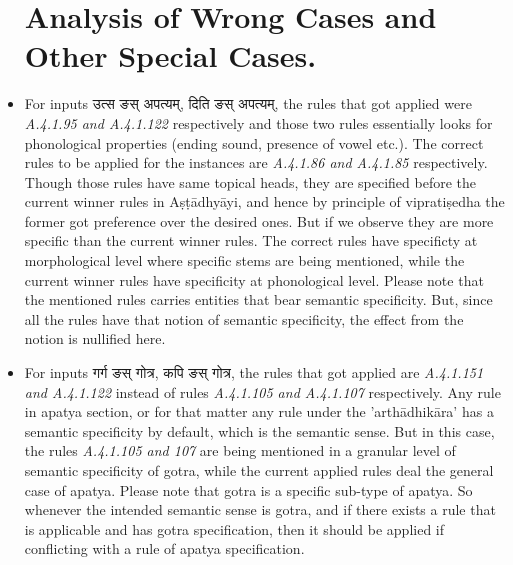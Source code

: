 \documentclass[a4paper,11pt,twoside,openright]{report}
\begin{document}
\begin{itemize}

\section{Analysis of Wrong Cases and Other Special Cases.}
\label{wrongCases}

\item For inputs {\skt उत्स ङस् अपत्यम्, दिति ङस् अपत्यम्}, the rules that got applied were \textsl{ A.4.1.95 and \sl A.4.1.122} respectively and those two rules essentially looks for phonological properties (ending sound, 	presence of vowel etc.). The correct rules to be applied for the instances are \textsl{ A.4.1.86 and A.4.1.85} respectively. Though those rules have same topical heads, they are specified before the current winner rules in Aṣṭādhyāyi, and hence by principle of vipratiṣedha  the former got preference over the desired ones. But if we observe they are more specific than the current winner rules. The correct rules have specificty at morphological level where specific stems are being mentioned, while the current winner rules have specificity at phonological level. Please note that  the mentioned rules carries entities that bear semantic specificity. But, since all the rules have that notion of semantic specificity, the effect from the notion is nullified here.

\item For inputs {\skt गर्ग ङस् गोत्र,  कपि ङस् गोत्र}, the rules that got applied are \textsl{ A.4.1.151 and A.4.1.122} instead of rules \textsl{ A.4.1.105 and A.4.1.107} respectively. Any rule in apatya section, or for that matter any rule under the 'arthādhikāra' has a semantic specificity by default, which is the semantic sense. But in this case, the rules \textsl{ A.4.1.105 and 107} are being mentioned in a granular level of semantic specificity of gotra, while the current applied rules deal the  general case of apatya. Please note that gotra is a specific sub-type of apatya. So whenever the intended semantic sense is gotra, and if there exists a rule that is applicable and has gotra specification, then it should be applied if conflicting with a rule of apatya specification.


\end{itemize}
\end{document}
